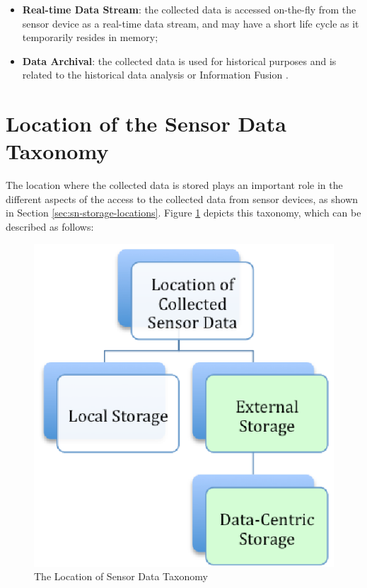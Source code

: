 \begin{itemize}
  \item \textbf{Real-time Data Stream}: the collected data is accessed
  on-the-fly from the sensor device as a real-time data stream, and may have a
  short life cycle as it temporarily resides in memory;
  \item \textbf{Data Archival}: the collected data is used for historical
  purposes and is related to the historical data analysis \cite{sn-intro01,
  sn-intro02} or Information Fusion \cite{sn-info-fusion}. 
\end{itemize}

\section{Location of the Sensor Data Taxonomy}

The location where the collected data is stored plays an important role
in the different aspects of the access to the collected data from sensor
devices, as shown in Section \ref{sec:sn-storage-locations}. Figure 
\ref{fig:taxonomy-data-location} depicts this taxonomy, which can be
described as follows:

\begin{figure}[h]
  \centering
  \includegraphics{../diagrams/taxonomy-data-location}
  \caption{The Location of Sensor Data Taxonomy}
  \label{fig:taxonomy-data-location}
\end{figure}

